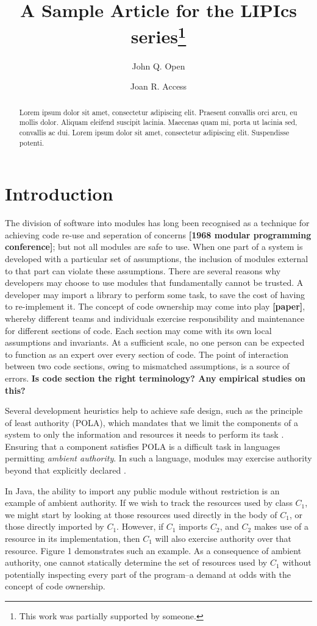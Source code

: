 \documentclass[a4paper,UKenglish]{lipics-v2016}
\title{A Sample Article for the LIPIcs series\footnote{This work was partially supported by someone.}}
\author[1]{John Q. Open}
\author[2]{Joan R. Access}
\affil[1]{Dummy University Computing Laboratory, Address/City, Country\\
  \texttt{open@dummyuniversity.org}}
\affil[2]{Department of Informatics, Dummy College, Address/City, Country\\
  \texttt{access@dummycollege.org}}
\begin{document}
\maketitle

\begin{abstract}
Lorem ipsum dolor sit amet, consectetur adipiscing elit. Praesent convallis orci arcu, eu mollis dolor. Aliquam eleifend suscipit lacinia. Maecenas quam mi, porta ut lacinia sed, convallis ac dui. Lorem ipsum dolor sit amet, consectetur adipiscing elit. Suspendisse potenti. 
 \end{abstract}

\section{Introduction}

The division of software into modules has long been recognised as a technique for achieving code re-use and seperation of concerns \textbf{[1968 modular programming conference]}; but not all modules are safe to use. When one part of a system is developed with a particular set of assumptions, the inclusion of modules external to that part can violate these assumptions. There are several reasons why developers may choose to use modules that fundamentally cannot be trusted. A developer may import a library to perform some task, to save the cost of having to re-implement it. The concept of code ownership may come into play \textbf{[paper]}, whereby different teams and individuals exercise responsibility and maintenance for different sections of code. Each section may come with its own local assumptions and invariants. At a sufficient scale, no one person can be expected to function as an expert over every section of code. The point of interaction between two code sections, owing to mismatched assumptions, is a source of errors. \textbf{Is code section the right terminology? Any empirical studies on this?}

Several development heuristics help to achieve safe design, such as the principle of least authority (POLA), which mandates that we limit the components of a system to only the information and resources it needs to perform its task \cite{saltzer74}. Ensuring that a component satisfies POLA is a difficult task in languages permitting \textit{ambient authority}. In such a language, modules may exercise authority beyond that explicitly declared \cite{miller03}.

In Java, the ability to import any public module without restriction is an example of ambient authority. If we wish to track the resources used by class $C_1$, we might start by looking at those resources used directly in the body of $C_1$, or those directly imported by $C_1$. However, if $C_1$ imports $C_2$, and $C_2$ makes use of a resource in its implementation, then $C_1$ will also exercise authority over that resource. Figure 1 demonstrates such an example. As a consequence of ambient authority, one cannot statically determine the set of resources used by $C_1$ without potentially inspecting every part of the program--a demand at odds with the concept of code ownership.
\end{document}
